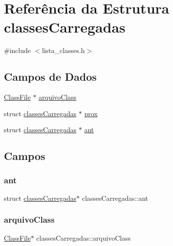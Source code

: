 \hypertarget{structclassesCarregadas}{}\section{Referência da Estrutura classes\+Carregadas}
\label{structclassesCarregadas}


{\ttfamily \#include $<$lista\+\_\+classes.\+h$>$}

\subsection*{Campos de Dados}
\begin{DoxyCompactItemize}
\item 
\hyperlink{classFileStruct_8h_aed419e54ca9f7e5ab3b22a3036af9993}{Class\+File} $\ast$ \hyperlink{structclassesCarregadas_a0bd56a3a1fe9cef7e3cd63a947cb2edb}{arquivo\+Class}
\item 
struct \hyperlink{structclassesCarregadas}{classes\+Carregadas} $\ast$ \hyperlink{structclassesCarregadas_a9be874f129111fad8157f3e4205e9e98}{prox}
\item 
struct \hyperlink{structclassesCarregadas}{classes\+Carregadas} $\ast$ \hyperlink{structclassesCarregadas_a2a075e91c50be2dbf5218507e5043a8e}{ant}
\end{DoxyCompactItemize}


\subsection{Campos}
\mbox{\label{structclassesCarregadas_a2a075e91c50be2dbf5218507e5043a8e}} 
\subsubsection{\texorpdfstring{ant}{ant}}
{\footnotesize\ttfamily struct \hyperlink{structclassesCarregadas}{classes\+Carregadas}$\ast$ classes\+Carregadas\+::ant}

\mbox{\label{structclassesCarregadas_a0bd56a3a1fe9cef7e3cd63a947cb2edb}} 
\subsubsection{\texorpdfstring{arquivo\+Class}{arquivoClass}}
{\footnotesize\ttfamily \hyperlink{classFileStruct_8h_aed419e54ca9f7e5ab3b22a3036af9993}{Class\+File}$\ast$ classes\+Carregadas\+::arquivo\+Class}

